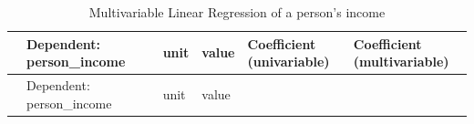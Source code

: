 \documentclass[
  10pt,
]{article}
\begin{document}
\begin{longtable}[]{@{}
  >{\raggedright\arraybackslash}p{}
  >{\raggedright\arraybackslash}p{}
  >{\raggedright\arraybackslash}p{}
  >{\raggedright\arraybackslash}p{}
  >{\raggedright\arraybackslash}p{}
  >{\raggedright\arraybackslash}p{}
  >{\raggedright\arraybackslash}p{}@{}}
\caption{Multivariable Linear Regression of a person's
income}\tabularnewline
\toprule\noalign{}
\begin{minipage}[b]{\linewidth}\raggedright
\end{minipage} & \begin{minipage}[b]{\linewidth}\raggedright
Dependent: person\_income
\end{minipage} & \begin{minipage}[b]{\linewidth}\raggedright
\end{minipage} & \begin{minipage}[b]{\linewidth}\raggedright
unit
\end{minipage} & \begin{minipage}[b]{\linewidth}\raggedright
value
\end{minipage} & \begin{minipage}[b]{\linewidth}\raggedright
Coefficient (univariable)
\end{minipage} & \begin{minipage}[b]{\linewidth}\raggedright
Coefficient (multivariable)
\end{minipage} \\
\midrule\noalign{}
\endfirsthead
\toprule\noalign{}
\begin{minipage}[b]{\linewidth}\raggedright
\end{minipage} & \begin{minipage}[b]{\linewidth}\raggedright
Dependent: person\_income
\end{minipage} & \begin{minipage}[b]{\linewidth}\raggedright
\end{minipage} & \begin{minipage}[b]{\linewidth}\raggedright
unit
\end{minipage} & \begin{minipage}[b]{\linewidth}\raggedright
value
\end{minipage} & \begin{minipage}[b]{\linewidth}\raggedright

\end{minipage}
\end{longtable}
\end{document}
